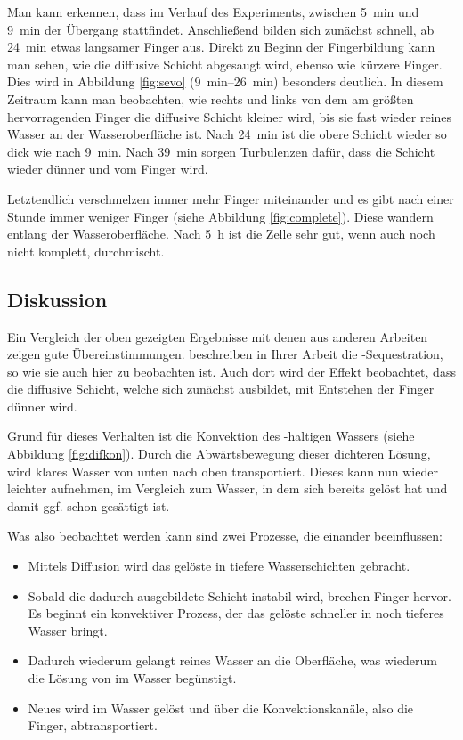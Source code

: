 Man kann erkennen, dass im Verlauf des Experiments, zwischen \SI{5}{\minute} und \SI{9}{\minute} der Übergang stattfindet. Anschließend bilden sich zunächst schnell, ab \SI{24}{\minute} etwas langsamer Finger aus. Direkt zu Beginn der Fingerbildung kann man sehen, wie die diffusive Schicht abgesaugt wird, ebenso wie kürzere Finger. Dies wird in Abbildung \ref{fig:sevo} (\SIrange{9}{26}{\minute}) besonders deutlich. In diesem Zeitraum kann man beobachten, wie rechts und links von dem am größten hervorragenden Finger die diffusive Schicht kleiner wird, bis sie fast wieder reines Wasser an der Wasseroberfläche ist. Nach \SI{24}{\minute} ist die obere \COT Schicht wieder so dick wie nach \SI{9}{\minute}. Nach \SI{39}{\minute} sorgen Turbulenzen dafür, dass die Schicht wieder dünner und vom Finger  wird.

Letztendlich verschmelzen immer mehr Finger miteinander und es gibt nach einer Stunde immer weniger Finger (siehe \zB Abbildung \ref{fig:complete}). Diese wandern entlang der Wasseroberfläche.
Nach \SI{5}{\hour} ist die Zelle sehr gut, wenn auch noch nicht komplett, durchmischt.


\subsection{Diskussion}
\label{res:cot:disk}

Ein Vergleich der oben gezeigten Ergebnisse mit denen aus anderen Arbeiten zeigen gute Übereinstimmungen.
\cite{kneafsy} beschreiben in Ihrer Arbeit die \COT-Sequestration, so wie sie auch hier zu beobachten ist. Auch dort wird der Effekt beobachtet, dass die diffusive Schicht, welche sich zunächst ausbildet, mit Entstehen der Finger dünner wird.

Grund für dieses Verhalten ist die Konvektion des \COT-haltigen Wassers (siehe Abbildung \ref{fig:difkon}). Durch die Abwärtsbewegung dieser dichteren Lösung, wird klares Wasser von unten nach oben transportiert. Dieses kann nun wieder leichter \COT aufnehmen, im Vergleich zum Wasser, in dem sich bereits \COT gelöst hat und damit ggf. schon gesättigt ist.

Was also beobachtet werden kann sind zwei Prozesse, die einander beeinflussen: 
\begin{itemize}
 \item Mittels Diffusion wird das gelöste \COT in tiefere Wasserschichten gebracht.
 \item Sobald die dadurch ausgebildete Schicht instabil wird, brechen Finger hervor. Es beginnt ein konvektiver Prozess, der das gelöste \COT schneller in noch tieferes Wasser bringt.
 \item Dadurch wiederum gelangt reines Wasser an die Oberfläche, was wiederum die Lösung von \COT im Wasser begünstigt.
 \item Neues \COT wird im Wasser gelöst und über die Konvektionskanäle, also die Finger, abtransportiert.
\end{itemize}

